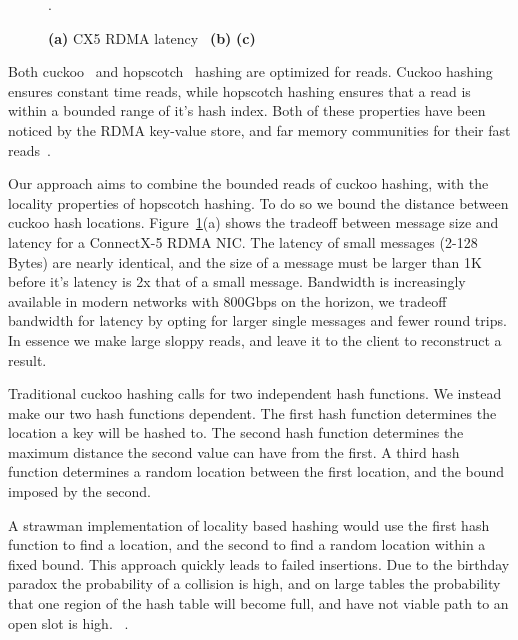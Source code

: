 \begin{figure}[t]
\begin{subfigure}{0.3\linewidth}
    \end{subfigure}.
    \vspace{-1em}
    \caption{
    \textbf{(a)} CX5 RDMA latency~\cite{rdma-latency}
    \textbf{(b)} 
    \textbf{(c)} 
    }
    \label{fig:rdma}

\end{figure}


Both cuckoo~\cite{cuckoo} and hopscotch~\cite{hopscotch}
hashing are optimized for reads. Cuckoo hashing ensures
constant time reads, while hopscotch hashing ensures that a
read is within a bounded range of it's hash index. Both of
these properties have been noticed by the RDMA key-value
store, and far memory communities for their fast
reads~\cite{memc3,cuckoo-improvements,pilaf,farm}.

Our approach aims to combine the bounded reads of cuckoo
hashing, with the locality properties of hopscotch hashing.
To do so we bound the distance between cuckoo hash
locations. Figure~\ref{fig:rdma}(a) shows the tradeoff
between message size and latency for a ConnectX-5 RDMA NIC.
The latency of small messages (2-128 Bytes) are nearly
identical, and the size of a message must be larger than 1K
before it's latency is 2x that of a small message. Bandwidth
is increasingly available in modern networks with 800Gbps on
the horizon, we tradeoff bandwidth for latency by opting for
larger single messages and fewer round trips. In essence we
make large sloppy reads, and leave it to the client to
reconstruct a result.

Traditional cuckoo hashing calls for
two independent hash functions. We instead make our two hash
functions dependent. The first hash function determines the
location a key will be hashed to. The second hash function
determines the maximum distance the second value can have
from the first. A third hash function determines a random
location between the first location, and the bound imposed
by the second.

A strawman implementation of locality based hashing would
use the first hash function to find a location, and the
second to find a random location within a fixed bound. This
approach quickly leads to failed insertions. Due to the
birthday paradox the probability of a collision is high, and
on large tables the probability that one region of the hash
table will become full, and have not viable path to an open
slot is high. ~.

